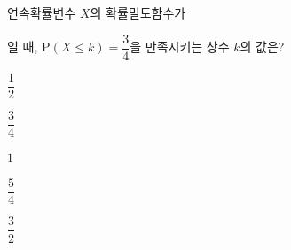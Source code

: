 연속확률변수 $X$의 확률밀도함수가 \par\smallskip{}\par\smallskip\noindent 일 때, $\mathrm{P}(X\le k)=\dfrac{3}{4}$을 만족시키는 상수 $k$의 값은?
\begin{choices32}{\rule[-3ex]{0pt}{8ex}$\dfrac{1}{2}$}{\rule[-3ex]{0pt}{8ex}$\dfrac{3}{4}$}{\rule[-3ex]{0pt}{8ex}$1$}{\rule[-3ex]{0pt}{8ex}$\dfrac{5}{4}$}{\rule[-3ex]{0pt}{8ex}$\dfrac{3}{2}$}\end{choices32}
